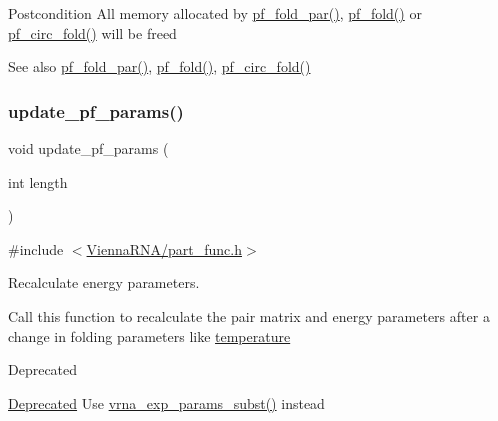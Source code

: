 \begin{DoxyPostcond}{Postcondition}
All memory allocated by \hyperlink{group__pf__fold_gac4f95bee734b2563a3d6e9932117ebdf}{pf\+\_\+fold\+\_\+par()}, \hyperlink{group__pf__fold_gadc3db3d98742427e7001a7fd36ef28c2}{pf\+\_\+fold()} or \hyperlink{group__pf__fold_ga819ce5fca8984004ac81c4a3b04cb735}{pf\+\_\+circ\+\_\+fold()} will be free\textquotesingle{}d 
\end{DoxyPostcond}
\begin{DoxySeeAlso}{See also}
\hyperlink{group__pf__fold_gac4f95bee734b2563a3d6e9932117ebdf}{pf\+\_\+fold\+\_\+par()}, \hyperlink{group__pf__fold_gadc3db3d98742427e7001a7fd36ef28c2}{pf\+\_\+fold()}, \hyperlink{group__pf__fold_ga819ce5fca8984004ac81c4a3b04cb735}{pf\+\_\+circ\+\_\+fold()} 
\end{DoxySeeAlso}
\mbox{\label{group__pf__fold_ga384e927890f9c034ff09fa66da102d28}} 
\subsubsection{\texorpdfstring{update\+\_\+pf\+\_\+params()}{update\_pf\_params()}}
{\footnotesize\ttfamily void update\+\_\+pf\+\_\+params (\begin{DoxyParamCaption}\item[{int}]{length }\end{DoxyParamCaption})}



{\ttfamily \#include $<$\hyperlink{part__func_8h}{Vienna\+R\+N\+A/part\+\_\+func.\+h}$>$}



Recalculate energy parameters. 

Call this function to recalculate the pair matrix and energy parameters after a change in folding parameters like \hyperlink{group__model__details_gab4b11c8d9c758430960896bc3fe82ead}{temperature}

\begin{DoxyRefDesc}{Deprecated}
\item[\hyperlink{deprecated__deprecated000105}{Deprecated}]Use \hyperlink{group__energy__parameters_ga8e7ac4fab3b0cc03afbc134eaafb3525}{vrna\+\_\+exp\+\_\+params\+\_\+subst()} instead\end{DoxyRefDesc}
\mbox{\label{group__pf__fold_gaafe2d1b21f5418b123b088aa395e827d}} 
